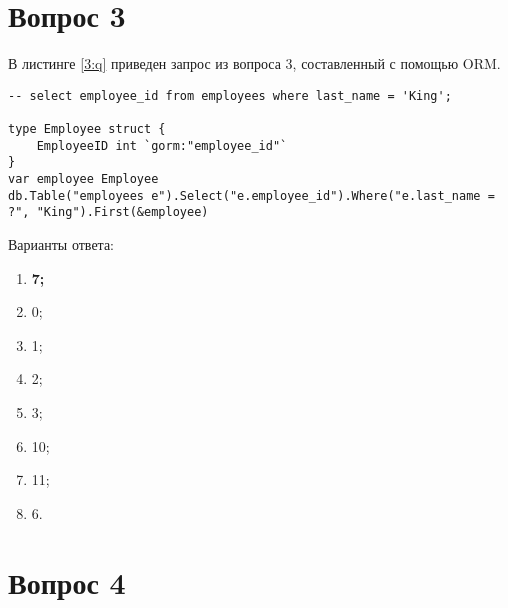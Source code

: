 \begin{appendices}
%
%
%
%
%

\section{Вопрос 3}

В листинге \ref{3:q} приведен запрос из вопроса 3, составленный с помощью ORM.

\begin{lstlisting}[label=3:q,caption=Вопрос 3]
-- select employee_id from employees where last_name = 'King';

type Employee struct {
	EmployeeID int `gorm:"employee_id"`
}
var employee Employee
db.Table("employees e").Select("e.employee_id").Where("e.last_name = ?", "King").First(&employee)
\end{lstlisting}

Варианты ответа:

\begin{enumerate}
	\item \textbf{7;}
	\item 0;
	\item 1;
	\item 2;
	\item 3;
	\item 10;
	\item 11;
	\item 6.
\end{enumerate}

\section{Вопрос 4}


\end{appendices}

